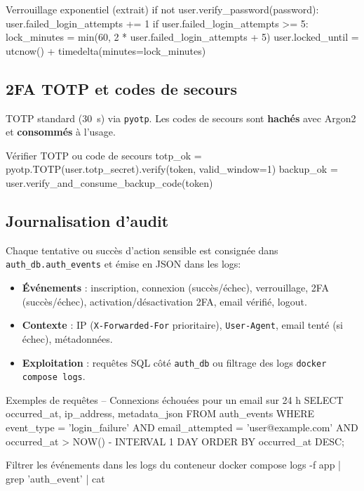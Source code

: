 \begin{codebox}[language=Python]{Verrouillage exponentiel (extrait)}
if not user.verify_password(password):
    user.failed_login_attempts += 1
    if user.failed_login_attempts >= 5:
        lock_minutes = min(60, 2 * user.failed_login_attempts + 5)
        user.locked_until = utcnow() + timedelta(minutes=lock_minutes)
\end{codebox}

\subsection*{2FA TOTP et codes de secours}
\noindent TOTP standard (30~s) via \texttt{pyotp}. Les codes de secours sont \textbf{hachés} avec Argon2 et \textbf{consommés} à l'usage.
\begin{codebox}[language=Python]{Vérifier TOTP ou code de secours}
totp_ok = pyotp.TOTP(user.totp_secret).verify(token, valid_window=1)
backup_ok = user.verify_and_consume_backup_code(token)
\end{codebox}

\subsection*{Journalisation d'audit}
\noindent Chaque tentative ou succès d'action sensible est consignée dans \texttt{auth\_db.auth\_events} et émise en JSON dans les logs:\
\begin{itemize}
  \item \textbf{Événements} : inscription, connexion (succès/échec), verrouillage, 2FA (succès/échec), activation/désactivation 2FA, email vérifié, logout.
  \item \textbf{Contexte} : IP (\texttt{X-Forwarded-For} prioritaire), \texttt{User-Agent}, email tenté (si échec), métadonnées.
  \item \textbf{Exploitation} : requêtes SQL côté \texttt{auth\_db} ou filtrage des logs \texttt{docker compose logs}.
\end{itemize}

\begin{codebox}[language=SQL]{Exemples de requêtes}
-- Connexions échouées pour un email sur 24 h
SELECT occurred_at, ip_address, metadata_json
FROM auth_events
WHERE event_type = 'login_failure'
  AND email_attempted = 'user@example.com'
  AND occurred_at > NOW() - INTERVAL 1 DAY
ORDER BY occurred_at DESC;
\end{codebox}

\begin{codebox}[language=bash]{Filtrer les événements dans les logs du conteneur}
docker compose logs -f app | grep 'auth_event' | cat
\end{codebox}

